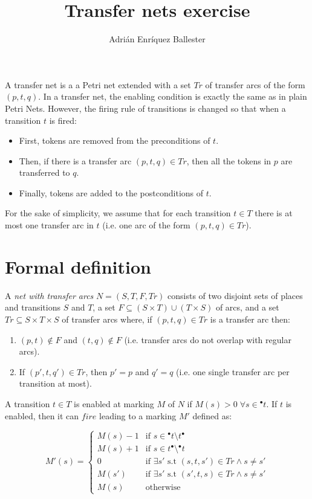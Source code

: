 \documentclass{article}
\title{Transfer nets exercise}
\author{Adrián Enríquez Ballester}
\begin{document}
\maketitle

A transfer net is a a Petri net extended with a set $Tr$
of transfer arcs of the form $(p, t, q)$. In a transfer
net, the enabling condition is exactly the same as in plain 
Petri Nets. However, the firing rule of transitions is changed 
so that when a transition $t$ is fired:

\begin{itemize}
  \item First, tokens are removed from the preconditions of $t$.
  \item Then, if there is a transfer arc $(p, t, q) \in Tr$, then 
    all the tokens in $p$ are transferred to $q$.
  \item Finally, tokens are added to the postconditions of $t$.
\end{itemize}

For the sake of simplicity, we assume that for each transition 
$t \in T$ there is at most one transfer arc in $t$ (i.e. one arc 
of the form $(p, t, q) \in Tr$).

\section{Formal definition}

A \textit{net with transfer arcs} $N=(S, T, F, Tr)$ consists 
of two disjoint sets of places and transitions $S$ and $T$, a
set $F \subseteq (S \times T) \cup (T \times S)$ of arcs,
and a set $Tr \subseteq S \times T \times S$ of transfer arcs 
where, if $(p, t, q) \in Tr$ is a transfer arc then:

\begin{enumerate}
  \item $(p, t) \notin F$ and $(t, q) \notin F$ (i.e. transfer 
    arcs do not overlap with regular arcs).
  \item If $(p', t, q') \in Tr$, then $p' = p$ and $q' = q$ 
    (i.e. one single transfer arc per transition at most).
\end{enumerate}

A transition $t \in T$ is enabled at marking $M$ of $N$ if 
$M(s) > 0\;\forall s \in {}^\bullet t$. If $t$ is 
enabled, then it can $fire$ leading to a marking $M'$ defined
as:

$$
M'(s) = 
  \begin{cases}
    M(s) - 1 &\text{if } s \in {}^\bullet t \setminus t^\bullet \\
    M(s) + 1 &\text{if } s \in t^\bullet \setminus {}^\bullet t \\
    0        &\text{if } \exists s' \text{ s.t } (s, t, s') \in Tr \land s \neq s' \\
    M(s')    &\text{if } \exists s' \text{ s.t } (s', t, s) \in Tr \land s \neq s' \\
    M(s)     &\text{otherwise}
  \end{cases}
$$
\end{document}
